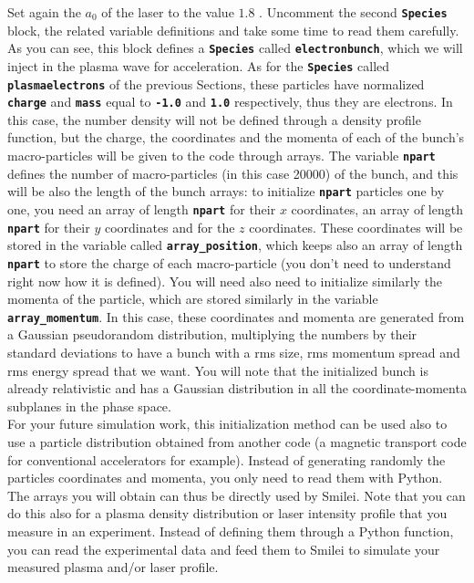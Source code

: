 \documentclass{article}
\newcommand{\smilei}{{\sc Smilei}\xspace}
\newcommand{\commandline}[1]{\texttt{\textbf{#1}}}
\begin{document}
Set again the $a_0$ of the laser to  the value $1.8$ . Uncomment the second \commandline{Species} block, the related variable definitions and take some time to read them carefully. As you can see, this block defines a \commandline{Species} called \commandline{electronbunch}, which we will inject in the plasma wave for acceleration. As for the \commandline{Species} called \commandline{plasmaelectrons} of the previous  Sections, these particles have normalized \commandline{charge} and \commandline{mass} equal to \commandline{-1.0} and \commandline{1.0} respectively, thus they are electrons. In this case,  the number density will not be defined through a density profile function, but the charge, the coordinates and the momenta of each of the bunch's macro-particles will be given to the code through arrays. The variable \commandline{npart} defines the number of macro-particles (in  this case 20000) of the bunch, and this will be also the length of the bunch arrays: to initialize \commandline{npart} particles one by one, you need an array of length \commandline{npart} for their $x$ coordinates, an array of length \commandline{npart} for their $y$ coordinates and for the $z$ coordinates. These coordinates will be stored in the variable called \commandline{array\_position}, which keeps also an array of length \commandline{npart} to store the charge of each macro-particle (you don't need to understand right now how it is defined). You will need also need to initialize similarly the momenta of the particle, which are stored similarly in the variable \commandline{array\_momentum}. In this case, these coordinates and momenta are generated from a Gaussian pseudorandom distribution, multiplying the numbers by their standard deviations to have a bunch with a rms size, rms momentum spread and rms energy spread that we want. You will note that the initialized bunch is already relativistic and has a Gaussian distribution in all the coordinate-momenta subplanes in the phase space.\\

For your future  simulation work, this initialization method can be used also to use a particle distribution obtained from another code (a magnetic transport code for conventional accelerators for example). Instead of generating randomly the particles coordinates and momenta, you only need to read them with Python. The arrays you will obtain can thus be directly used by \smilei. Note that you can do this also for a plasma density distribution or laser intensity profile that you measure in an experiment. Instead of defining them through a Python function, you  can read the experimental data and feed them to \smilei to simulate your measured plasma and/or laser profile.\\
\end{document}
